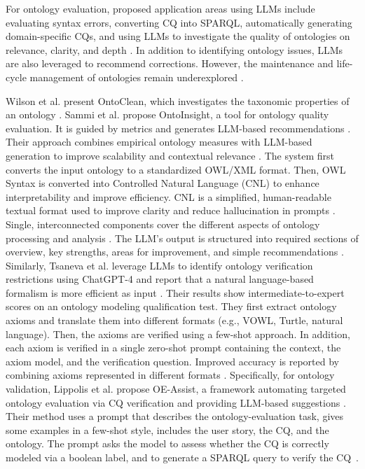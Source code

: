 \documentclass[
]{ceurart}
\begin{document}
For ontology evaluation, proposed application areas using LLMs include evaluating syntax errors, converting CQ into SPARQL, automatically generating domain-specific CQs, and using LLMs to investigate the quality of ontologies on relevance, clarity, and depth \cite{li2025large,Lippolis2025}. In addition to identifying ontology issues, LLMs are also leveraged to recommend corrections. However, the maintenance and life-cycle management of ontologies remain underexplored \cite{li2025large}. 

Wilson et al. present OntoClean, which investigates the taxonomic properties of an ontology \cite{Wilson2022}. Sammi et al. propose OntoInsight, a tool for ontology quality evaluation. It is guided by metrics and generates LLM-based recommendations \cite{Sammi2025}. Their approach combines empirical ontology measures with LLM-based generation to improve scalability and contextual relevance \cite{Sammi2025}. The system first converts the input ontology to a standardized OWL/XML format. Then, OWL Syntax is converted into Controlled Natural Language (CNL) to enhance interpretability and improve efficiency. CNL is a simplified, human-readable textual format used to improve clarity and reduce hallucination in prompts \cite{Sammi2025,Tsaneva2024}. Single, interconnected components cover the different aspects of ontology processing and analysis \cite{Sammi2025}. The LLM’s output is structured into required sections of overview, key strengths, areas for improvement, and simple recommendations \cite{Sammi2025}. 
Similarly, Tsaneva et al. leverage LLMs to identify ontology verification restrictions using ChatGPT-4 and report that a natural language-based formalism is more efficient as input \cite{Tsaneva2024}. Their results show intermediate-to-expert scores on an ontology modeling qualification test. They first extract ontology axioms and translate them into different formats (e.g., VOWL, Turtle, natural language). Then, the axioms are verified using a few-shot approach. In addition, each axiom is verified in a single zero-shot prompt containing the context, the axiom model, and the verification question. Improved accuracy is reported by combining axioms represented in different formats \cite{Tsaneva2024}.
Specifically, for ontology validation, Lippolis et al. propose OE-Assist, a framework automating targeted ontology evaluation via CQ verification and providing LLM-based suggestions \cite{Lippolis2025}. Their method uses a prompt that describes the ontology-evaluation task, gives some examples in a few-shot style, includes the user story, the CQ, and the ontology. The prompt asks the model to assess whether the CQ is correctly modeled via a boolean label, and to generate a SPARQL query to verify the CQ~\cite{Lippolis2025}. 
\end{document}
